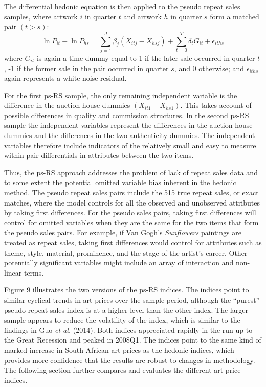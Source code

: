 \documentclass[12pt,]{article}
\begin{document}
The differential hedonic equation is then applied to the pseudo repeat
sales samples, where artwork \(i\) in quarter \(t\) and artwork \(h\) in
quarter \(s\) form a matched pair \((t>s)\):
\[\ln P_{it} - \ln P_{hs} = \sum_{j=1}^J \beta_j (X_{itj} - X_{hsj}) + \sum_{t=0}^T \delta_t G_{it} + \epsilon_{iths}\]
where \(G_{it}\) is again a time dummy equal to 1 if the later sale
occurred in quarter \(t\), -1 if the former sale in the pair occurred in
quarter \(s\), and 0 otherwise; and \(\epsilon_{iths}\) again represents
a white noise residual.

For the first ps-RS sample, the only remaining independent variable is
the difference in the auction house dummies \((X_{it1} - X_{hs1})\).
This takes account of possible differences in quality and commission
structures. In the second ps-RS sample the independent variables
represent the differences in the auction house dummies and the
differences in the two authenticity dummies. The independent variables
therefore include indicators of the relatively small and easy to measure
within-pair differentials in attributes between the two items.

Thus, the ps-RS approach addresses the problem of lack of repeat sales
data and to some extent the potential omitted variable bias inherent in
the hedonic method. The pseudo repeat sales pairs include the 515 true
repeat sales, or exact matches, where the model controls for all the
observed and unobserved attributes by taking first differences. For the
pseudo sales pairs, taking first differences will control for omitted
variables when they are the same for the two items that form the pseudo
sales pairs. For example, if Van Gogh's \emph{Sunflowers} paintings are
treated as repeat sales, taking first differences would control for
attributes such as theme, style, material, prominence, and the stage of
the artist's career. Other potentially significant variables might
include an array of interaction and non-linear terms.

Figure 9 illustrates the two versions of the ps-RS indices. The indices
point to similar cyclical trends in art prices over the sample period,
although the ``purest'' pseudo repeat sales index is at a higher level
than the other index. The larger sample appears to reduce the volatility
of the index, which is similar to the findings in Guo \emph{et al.}
(2014). Both indices appreciated rapidly in the run-up to the Great
Recession and peaked in 2008Q1. The indices point to the same kind of
marked increase in South African art prices as the hedonic indices,
which provides more confidence that the results are robust to changes in
methodology. The following section further compares and evaluates the
different art price indices.
\end{document}
